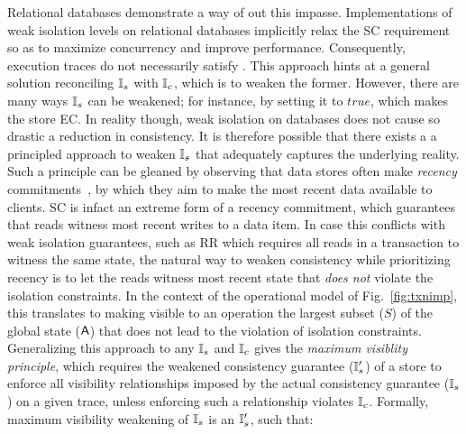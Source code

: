 Relational databases demonstrate a way of out this impasse.
Implementations of weak isolation levels on relational databases
implicitly relax the SC requirement so as to maximize concurrency and
improve performance. Consequently, execution traces do not necessarily
satisfy . This approach hints at a general solution reconciling
$\mathbb{I}_s$ with $\mathbb{I}_c$, which is to weaken the former. However, there are
many ways $\mathbb{I}_s$ can be weakened; for instance, by setting it to
$true$, which makes the store EC. In reality though, weak isolation on
databases does not cause so drastic a reduction in consistency. It is
therefore possible that there exists a a principled approach to weaken
$\mathbb{I}_s$ that adequately captures the underlying reality. Such a
principle can be gleaned by observing that data stores often make
\emph{recency} commitments~\cite{bailishat}, by which they aim to make
the most recent data available to clients. SC is infact an extreme
form of a recency commitment, which guarantees that reads witness most
recent writes to a data item. In case this conflicts with weak
isolation guarantees, such as RR which requires all reads in a
transaction to witness the same state, the natural way to weaken
consistency while prioritizing recency is to let the reads witness
most recent state that \emph{does not} violate the isolation
constraints. In the context of the operational model of
Fig.~\ref{fig:txnimp}, this translates to making visible to an
operation the largest subset ($S$) of the global state ($\textsf{A}$) that
does not lead to the violation of isolation constraints. Generalizing
this approach to any $\mathbb{I}_s$ and $\mathbb{I}_c$ gives the \emph{maximum
visiblity principle}, which requires the weakened consistency
guarantee ($\mathbb{I}_s'$) of a store to enforce all visibility relationships
imposed by the actual consistency guarantee ($\mathbb{I}_s$) on a given trace,
unless enforcing such a relationship violates $\mathbb{I}_c$.  Formally,
maximum visibility weakening of $\mathbb{I}_s$ is an $\mathbb{I}_s'$, such that:

